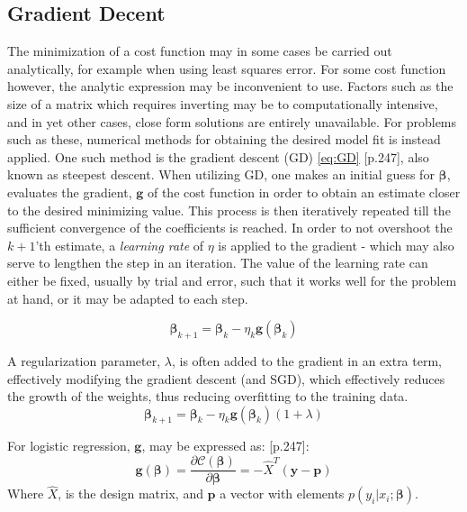 \documentclass[%
oneside,                 %
final,                   %
10pt]{article}
\begin{document}
\subsection{Gradient Decent}  \label{Section_M_GD}
The minimization of a cost function may in some cases be carried out analytically, for example when using least squares error. For some cost function however, the analytic expression may be inconvenient to use. Factors such as the size of a matrix which requires inverting may be to computationally intensive, and in yet other cases, close form solutions are entirely unavailable. For problems such as these, numerical methods for obtaining the desired model fit is instead applied. One such method is the gradient descent (GD) \eqref{eq:GD} \citep{MLMurphy}[p.247], also known as steepest descent. When utilizing GD, one makes an initial guess for $\bm{\beta}$, evaluates the gradient, $\bm g$ of the cost function in order to obtain an estimate closer to the desired minimizing value. This process is then iteratively repeated till the sufficient convergence of the coefficients is reached. In order to not overshoot the $k+1$'th estimate, a \textit{learning rate} of $\eta$ is applied to the gradient - which may also serve to lengthen the step in an iteration. The value of the learning rate can either be fixed, usually by trial and error, such that it works well for the problem at hand, or it may be adapted to each step. 

\begin{equation}
\bm{\beta}_{k+1}=\bm{\beta}_{k}-\eta_k  \bm g (\bm{\beta}_k)
\label{eq:GD}
\end{equation}

A regularization parameter, $\lambda $, is often added to the gradient in an extra term, effectively modifying the gradient descent (and SGD), which effectively reduces the growth of the weights, thus reducing overfitting to the training data.
\begin{equation}
\bm{\beta}_{k+1}=\bm{\beta}_{k}-\eta_k  \bm g (\bm{\beta}_k)(1+\lambda)
\end{equation}

For logistic regression, $\bm g$, may be expressed as: \citep{MLMurphy}[p.247]:
\begin{equation}
\bm g (\bm \beta)= \frac{\partial \mathcal{C}(\bm{\beta})}{\partial \bm \beta}= -\hat{X}^T(\bm y-\bm p )
\end{equation}
Where $\hat{X}$, is the design matrix, and $\bm p$ a vector with elements $p(y_i|x_i;\bm \beta)$. \newline
\end{document}
